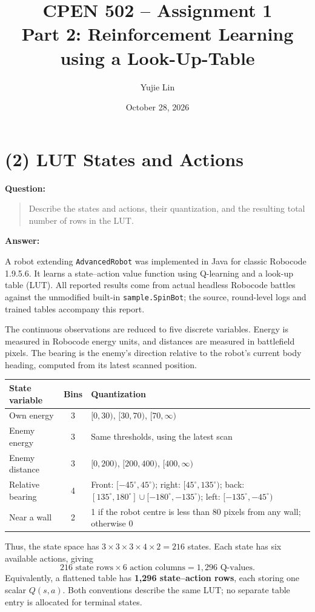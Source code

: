 \documentclass[11pt,letterpaper]{article}
\title{CPEN 502 -- Assignment 1\\Part 2: Reinforcement Learning using a Look-Up-Table}
\author{Yujie Lin}
\date{October 28, 2026}
\newcommand{\question}[1]{\noindent\textbf{Question:}\begin{quote}#1\end{quote}\noindent\textbf{Answer:}\par}
\begin{document}
\maketitle
\section*{(2) LUT States and Actions}
\question{Describe the states and actions, their quantization, and the resulting total number of rows in the LUT.}
A robot extending \texttt{AdvancedRobot} was implemented in Java for classic Robocode 1.9.5.6. It learns a state--action value function using Q-learning and a look-up table (LUT). All reported results come from actual headless Robocode battles against the unmodified built-in \texttt{sample.SpinBot}; the source, round-level logs and trained tables accompany this report.

The continuous observations are reduced to five discrete variables. Energy is measured in Robocode energy units, and distances are measured in battlefield pixels. The bearing is the enemy's direction relative to the robot's current body heading, computed from its latest scanned position.
\begin{center}\small
\begin{tabular}{p{1.12in}cp{3.65in}}
\toprule
State variable & Bins & Quantization \\\midrule
Own energy & 3 & $[0,30)$, $[30,70)$, $[70,\infty)$ \\
Enemy energy & 3 & Same thresholds, using the latest scan \\
Enemy distance & 3 & $[0,200)$, $[200,400)$, $[400,\infty)$ \\
Relative bearing & 4 & Front: $[-45^\circ,45^\circ)$; right: $[45^\circ,135^\circ)$; back: $[135^\circ,180^\circ]\cup[-180^\circ,-135^\circ)$; left: $[-135^\circ,-45^\circ)$ \\
Near a wall & 2 & 1 if the robot centre is less than 80 pixels from any wall; otherwise 0 \\
\bottomrule
\end{tabular}
\end{center}
Thus, the state space has $3\times3\times3\times4\times2=216$ states. Each state has six available actions, giving
\[
\boxed{216\text{ state rows}\times6\text{ action columns}=1,296\text{ Q-values}.}
\]
Equivalently, a flattened table has \textbf{1,296 state--action rows}, each storing one scalar $Q(s,a)$. Both conventions describe the same LUT; no separate table entry is allocated for terminal states.
\end{document}
